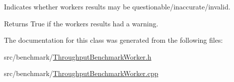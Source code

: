 Indicates whether worker\textquotesingle{}s results may be questionable/inaccurate/invalid. 

\begin{DoxyReturn}{Returns}
True if the worker\textquotesingle{}s results had a warning. 
\end{DoxyReturn}


The documentation for this class was generated from the following files\+:\begin{DoxyCompactItemize}
\item 
src/benchmark/\hyperlink{_throughput_benchmark_worker_8h}{Throughput\+Benchmark\+Worker.\+h}\item 
src/benchmark/\hyperlink{_throughput_benchmark_worker_8cpp}{Throughput\+Benchmark\+Worker.\+cpp}\end{DoxyCompactItemize}
